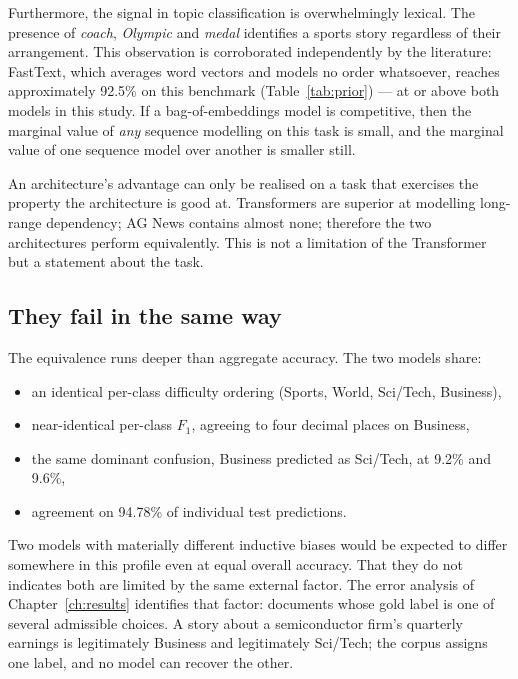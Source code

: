 Furthermore, the signal in topic classification is overwhelmingly lexical. The presence of
\emph{coach}, \emph{Olympic} and \emph{medal} identifies a sports story regardless of their
arrangement. This observation is corroborated independently by the literature: FastText, which
averages word vectors and models no order whatsoever, reaches approximately 92.5\% on this
benchmark (Table~\ref{tab:prior}) --- at or above both models in this study. If a bag-of-embeddings
model is competitive, then the marginal value of \emph{any} sequence modelling on this task is
small, and the marginal value of one sequence model over another is smaller still.

 An architecture's advantage can only be realised on a
task that exercises the property the architecture is good at. Transformers are superior at modelling
long-range dependency; AG News contains almost none; therefore the two architectures perform
equivalently. This is not a limitation of the Transformer but a statement about the task.

\subsection{They fail in the same way}

The equivalence runs deeper than aggregate accuracy. The two models share:

\begin{itemize}
\item an identical per-class difficulty ordering (Sports, World, Sci/Tech, Business),
\item near-identical per-class $F_1$, agreeing to four decimal places on Business,
\item the same dominant confusion, Business predicted as Sci/Tech, at 9.2\% and 9.6\%,
\item agreement on 94.78\% of individual test predictions.
\end{itemize}

Two models with materially different inductive biases would be expected to differ somewhere in this
profile even at equal overall accuracy. That they do not indicates both are limited by the same
external factor. The error analysis of Chapter~\ref{ch:results} identifies that factor: documents
whose gold label is one of several admissible choices. A story about a semiconductor firm's
quarterly earnings is legitimately Business and legitimately Sci/Tech; the corpus assigns one
label, and no model can recover the other.

